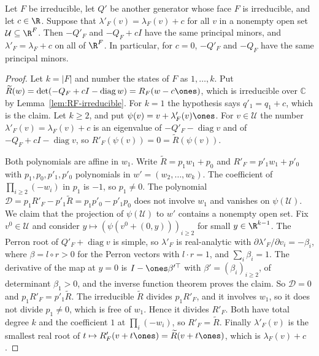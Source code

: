 \begin{lemma}\label{lem:perron-branch}
Let $F$ be irreducible, let $Q'$ be another generator whose face $F$ is
irreducible, and let $c\in\R$. Suppose that $\lambda'_F(v)=\lambda_F(v)+c$ for
all $v$ in a nonempty open set $\mathcal U\subseteq\R^F$. Then $-Q'_F$ and $-Q_F+cI$ have the
same principal minors, and $\lambda'_F=\lambda_F+c$ on all of $\R^F$. In
particular, for $c=0$, $-Q'_F$ and $-Q_F$ have the same principal minors.
\end{lemma}

\begin{proof}
Let $k=|F|$ and number the states of $F$ as $1,\dots,k$. Put
$\widetilde R(w)=\det(-Q_F+cI-\operatorname{diag}w)=R_F(w-c\ones)$, which is
irreducible over $\mathbb C$ by Lemma~\ref{lem:RF-irreducible}. For $k=1$ the
hypothesis says $q'_1=q_1+c$, which is the claim. Let $k\ge2$, and put
$\psi(v)=v+\lambda'_F(v)\ones$. For $v\in \mathcal U$ the number
$\lambda'_F(v)=\lambda_F(v)+c$ is an eigenvalue of $-Q'_F-\operatorname{diag}v$ and
of $-Q_F+cI-\operatorname{diag}v$, so $R'_F(\psi(v))=0=\widetilde R(\psi(v))$.

Both polynomials are affine in $w_1$. Write $\widetilde R=p_1w_1+p_0$ and
$R'_F=p'_1w_1+p'_0$ with $p_1,p_0,p'_1,p'_0$ polynomials in
$w'=(w_2,\dots,w_k)$. The coefficient of $\prod_{i\ge2}(-w_i)$ in $p_1$ is
$-1$, so $p_1\ne0$. The polynomial
$\mathcal D=p_1R'_F-p'_1\widetilde R=p_1p'_0-p'_1p_0$ does not
involve $w_1$ and vanishes on $\psi(\mathcal U)$. We claim that the projection of
$\psi(\mathcal U)$ to $w'$ contains a nonempty open set. Fix $v^0\in \mathcal U$ and consider
$y\mapsto(\psi(v^0+(0,y)))_{i\ge2}$ for small $y\in\R^{k-1}$. The Perron root of
$Q'_F+\operatorname{diag}v$ is simple, so $\lambda'_F$ is real-analytic with
$\partial\lambda'_F/\partial v_i=-\beta_i$, where $\beta=l\circ r>0$ for the
Perron vectors with $l\cdot r=1$, and $\sum_i\beta_i=1$. The derivative of the
map at $y=0$ is $I-\ones\beta'^\top$ with $\beta'=(\beta_i)_{i\ge2}$, of
determinant $\beta_1>0$, and the inverse function theorem proves the claim. So
$\mathcal D=0$ and $p_1R'_F=p'_1\widetilde R$. The irreducible $\widetilde R$
divides $p_1R'_F$, and it involves $w_1$, so it does not divide $p_1\ne0$, which
is free of $w_1$. Hence it divides $R'_F$. Both have total degree $k$ and the coefficient $1$ at
$\prod_i(-w_i)$, so $R'_F=\widetilde R$. Finally $\lambda'_F(v)$ is the smallest
real root of $t\mapsto R'_F(v+t\ones)=\widetilde R(v+t\ones)$, which is
$\lambda_F(v)+c$.
\end{proof}

